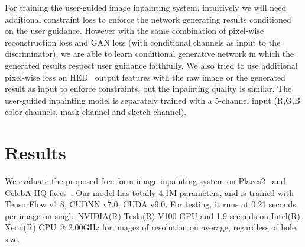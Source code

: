 \documentclass[10pt,twocolumn,letterpaper]{article}
\begin{document}
For training the user-guided image inpainting system, intuitively we will need additional constraint loss to enforce the network generating results conditioned on the user guidance. However with the same combination of pixel-wise reconstruction loss and GAN loss (with conditional channels as input to the discriminator), we are able to learn conditional generative network in which the generated results respect user guidance faithfully. We also tried to use additional pixel-wise loss on HED~\cite{xie2015holistically} output features with the raw image or the generated result as input to enforce constraints, but the inpainting quality is similar. The user-guided inpainting model is separately trained with a 5-channel input (R,G,B color channels, mask channel and sketch channel). 
\section{Results}
\label{secs:results}

We evaluate the proposed free-form image inpainting system on Places2~\cite{zhou2017places} and CelebA-HQ faces~\cite{karras2017progressive}.
Our model has totally 4.1M parameters, and is trained with TensorFlow v1.8, CUDNN v7.0, CUDA v9.0.
For testing, it runs at 0.21 seconds per image on single NVIDIA(R) Tesla(R) V100 GPU and 1.9 seconds on Intel(R) Xeon(R) CPU @ 2.00GHz for images of resolution  on average, regardless of hole size.
\end{document}
